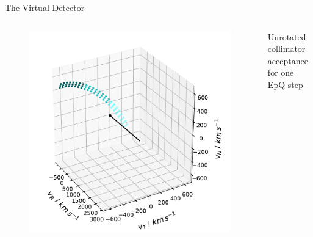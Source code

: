 \documentclass{beamer}
\begin{document}
\begin{frame}{The Virtual Detector}
	\begin{columns}
		\column[]{6.5cm}
		\begin{figure}
					\includegraphics[scale=0.35]{Pics/col_single_new.pdf}
			\end{figure}
	{\scriptsize \begin{center}
				Unrotated collimator acceptance \\ for one EpQ step
	\end{center}}


\end{columns}
\end{frame}
\end{document}
